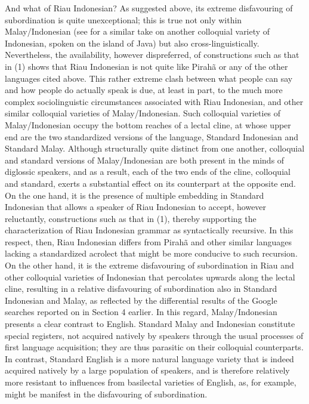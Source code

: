 \documentclass[output=paper,colorlinks,citecolor=brown
]{langscibook}
\begin{document}
And what of Riau Indonesian?  As suggested above, its extreme disfavouring of subordination is quite unexceptional; this is true not only within Malay/Indonesian (see \cite{englebretson2003searching} for a similar take on another colloquial variety of Indonesian, spoken on the island of Java) but also cross-linguistically. Nevertheless, the availability, however dispreferred,  of constructions such as that in (1) shows that Riau Indonesian is not quite like Pirahã or any of the other languages cited above.  This rather extreme clash between what people can say and how people do actually speak is due, at least in part, to the much more complex sociolinguistic circumstances associated with Riau Indonesian, and other similar colloquial varieties of Malay/Indonesian. Such colloquial varieties of Malay/Indonesian occupy the bottom reaches of a lectal cline, at whose upper end are the two standardized versions of the language, Standard Indonesian and Standard Malay.  Although structurally quite distinct from one another, colloquial and standard versions of Malay/Indonesian are both present in the minds of diglossic speakers, and as a result, each of the two ends of the cline, colloquial and standard, exerts a substantial effect on its counterpart at the opposite end.  On the one hand, it is the presence of multiple embedding in Standard Indonesian that allows a speaker of Riau Indonesian to accept, however reluctantly, constructions such as that in (1), thereby supporting the characterization of Riau Indonesian grammar as syntactically recursive. In this respect, then, Riau Indonesian differs from Pirahã and other similar languages lacking a standardized acrolect that might be more conducive to such recursion.  On the other hand, it is the extreme disfavouring of subordination in Riau and other colloquial varieties of Indonesian that percolates upwards along the lectal cline, resulting in a relative disfavouring of subordination also in Standard Indonesian and Malay, as reflected by the differential results of the Google searches reported on in Section 4 earlier.  In this regard, Malay/Indonesian presents a clear contrast to English.  Standard Malay and Indonesian constitute special registers, not acquired natively by speakers through the usual processes of first language acquisition; they are thus parasitic on their colloquial counterparts. In contrast, Standard English is a more natural language variety that is indeed acquired natively by a large population of speakers, and is therefore relatively more resistant to influences from basilectal varieties of English, as, for example, might be manifest in the disfavouring of subordination.
\end{document}
